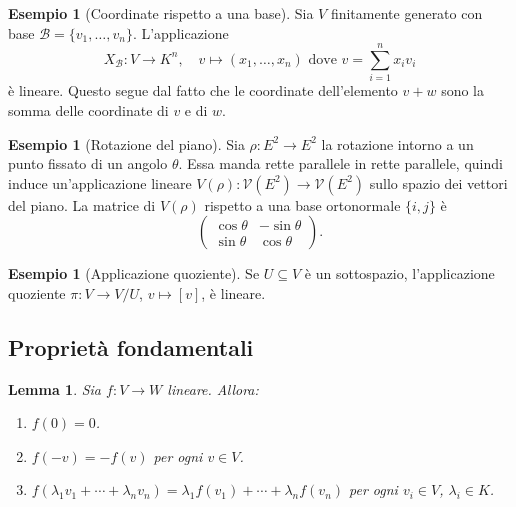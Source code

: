 \documentclass[11pt, a4paper]{book}
\theoremstyle{definition}
\newtheorem{esempio}[definizione]{Esempio}
\theoremstyle{plain}
\newtheorem{lemma}[definizione]{Lemma}
\theoremstyle{remark}
\begin{document}
\begin{exbox}
\begin{esempio}[Coordinate rispetto a una base]
Sia $V$ finitamente generato con base $\mathcal{B} = \{v_1, \ldots, v_n\}$. L'applicazione
\[
  X_\mathcal{B} \colon V \to K^n, \quad v \mapsto (x_1, \ldots, x_n) \text{ dove } v = \sum_{i=1}^n x_i v_i
\]
è lineare. Questo segue dal fatto che le coordinate dell'elemento $v+w$ sono la somma delle coordinate di $v$ e di $w$.
\end{esempio}
\end{exbox}

\begin{exbox}
\begin{esempio}[Rotazione del piano]
Sia $\rho \colon E^2 \to E^2$ la rotazione intorno a un punto fissato di un angolo $\theta$. Essa manda rette parallele in rette parallele, quindi induce un'applicazione lineare $V(\rho) \colon \mathcal{V}(E^2) \to \mathcal{V}(E^2)$ sullo spazio dei vettori del piano. La matrice di $V(\rho)$ rispetto a una base ortonormale $\{i, j\}$ è
\[
  \begin{pmatrix} \cos\theta & -\sin\theta \\ \sin\theta & \cos\theta \end{pmatrix}.
\]
\end{esempio}
\end{exbox}

\begin{exbox}
\begin{esempio}[Applicazione quoziente]
Se $U \subseteq V$ è un sottospazio, l'applicazione quoziente $\pi \colon V \to V/U$, $v \mapsto [v]$, è lineare.
\end{esempio}
\end{exbox}

\subsection{Proprietà fondamentali}

\begin{lemma}
\label{lem:lin0}
Sia $f \colon V \to W$ lineare. Allora:
\begin{enumerate}
  \item $f(0) = 0$.
  \item $f(-v) = -f(v)$ per ogni $v \in V$.
  \item $f(\lambda_1 v_1 + \cdots + \lambda_n v_n) = \lambda_1 f(v_1) + \cdots + \lambda_n f(v_n)$ per ogni $v_i \in V$, $\lambda_i \in K$.
\end{enumerate}
\end{lemma}
\end{document}
